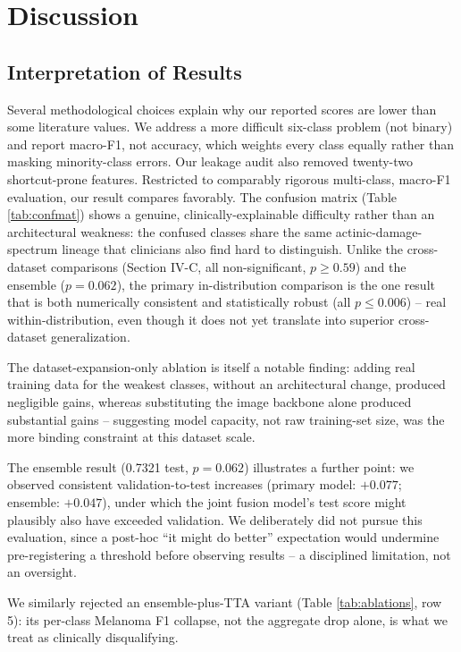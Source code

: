 \documentclass[conference]{IEEEtran}
\begin{document}
\section{Discussion}

\subsection{Interpretation of Results}
Several methodological choices explain why our reported scores are lower than some literature values. We address a more difficult six-class problem (not binary) and report macro-F1, not accuracy, which weights every class equally rather than masking minority-class errors. Our leakage audit also removed twenty-two shortcut-prone features. Restricted to comparably rigorous multi-class, macro-F1 evaluation, our result compares favorably. The confusion matrix (Table \ref{tab:confmat}) shows a genuine, clinically-explainable difficulty rather than an architectural weakness: the confused classes share the same actinic-damage-spectrum lineage that clinicians also find hard to distinguish. Unlike the cross-dataset comparisons (Section IV-C, all non-significant, $p \geq 0.59$) and the ensemble ($p=0.062$), the primary in-distribution comparison is the one result that is both numerically consistent and statistically robust (all $p \leq 0.006$) -- real within-distribution, even though it does not yet translate into superior cross-dataset generalization.

The dataset-expansion-only ablation is itself a notable finding: adding real training data for the weakest classes, without an architectural change, produced negligible gains, whereas substituting the image backbone alone produced substantial gains -- suggesting model capacity, not raw training-set size, was the more binding constraint at this dataset scale.

The ensemble result (0.7321 test, $p=0.062$) illustrates a further point: we observed consistent validation-to-test increases (primary model: $+0.077$; ensemble: $+0.047$), under which the joint fusion model's test score might plausibly also have exceeded validation. We deliberately did not pursue this evaluation, since a post-hoc ``it might do better'' expectation would undermine pre-registering a threshold before observing results -- a disciplined limitation, not an oversight.

We similarly rejected an ensemble-plus-TTA variant (Table \ref{tab:ablations}, row 5): its per-class Melanoma F1 collapse, not the aggregate drop alone, is what we treat as clinically disqualifying.
\end{document}
